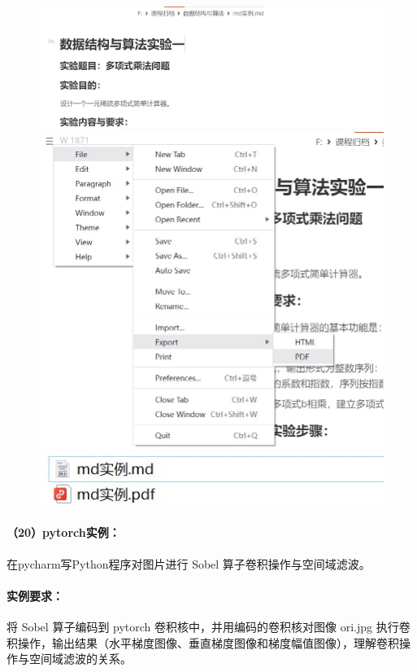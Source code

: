 \documentclass[a4paper, 12pt]{article}
\begin{document}
	\begin{figure}[H]
		\centering
		\includegraphics[width=1\textwidth]{096.jpg}
		\includegraphics[width=1\textwidth]{095.jpg}
		\includegraphics[width=1\textwidth]{097.jpg}
	\end{figure}
	
	\paragraph{（20）pytorch实例：}
	在pycharm写Python程序对图片进行 Sobel 算子卷积操作与空间域滤波。
	
	\paragraph{实例要求：}
	将 Sobel 算子编码到 pytorch 卷积核中，并用编码的卷积核对图像
	ori.jpg 执行卷积操作，输出结果（水平梯度图像、垂直梯度图像和梯度幅值图像），理解卷积操作与空间域滤波的关系。
	
\end{document}

